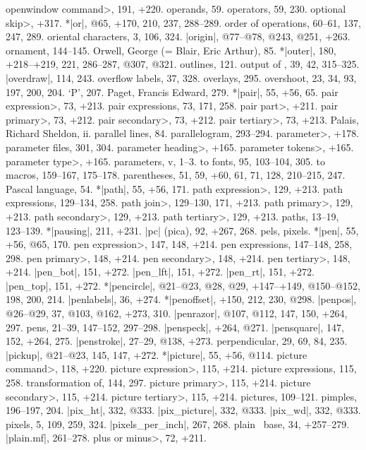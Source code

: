 \<openwindow command>, 191, +220.
operands, 59.
operators, 59, 230.
\<optional skip>, +317.
*|or|, @65, +170, 210, 237, 288--289.
order of operations, 60--61, 137, 247, 289.
oriental characters, 3, 106, 324.
|origin|, @77--@78, @243, @251, +263.
ornament, 144--145.
Orwell, George (= Blair, Eric Arthur), 85.
*|outer|, 180, +218--+219, 221, 286--287, @307, @321.
outlines, 121.
output of \MF, 39, 42, 315--325.
|overdraw|, 114, 243.
overflow labels, 37, 328.
overlays, 295.
overshoot, 23, 34, 93, 197, 200, 204.
\newletter
`P', 207.
Paget, Francis Edward, 279.
*|pair|, 55, +56, 65.
\<pair expression>, 73, +213.
pair expressions, 73, 171, 258.
\<pair part>, +211.
\<pair primary>, 73, +212.
\<pair secondary>, 73, +212.
\<pair tertiary>, 73, +213.
Palais, Richard Sheldon, ii.
parallel lines, 84.
parallelogram, 293--294.
\<parameter>, +178.
parameter files, 301, 304.
\<parameter heading>, +165.
\<parameter tokens>, +165.
\<parameter type>, +165.
parameters, v, 1--3.
\sub to fonts, 95, 103--104, 305.
\sub to macros, 159--167, 175--178.
parentheses, 51, 59, +60, 61, 71, 128, 210--215, 247.
Pascal language, 54.
*|path|, 55, +56, 171.
\<path expression>, 129, +213.
path expressions, 129--134, 258.
\<path join>, 129--130, 171, +213.
\<path primary>, 129, +213.
\<path secondary>, 129, +213.
\<path tertiary>, 129, +213.
paths, 13--19, 123--139.
*|pausing|, 211, +231.
|pc| (pica), 92, +267, 268.
pels, \see pixels.
*|pen|, 55, +56, @65, 170.
\<pen expression>, 147, 148, +214.
pen expressions, 147--148, 258, 298.
\<pen primary>, 148, +214.
\<pen secondary>, 148, +214.
\<pen tertiary>, 148, +214.
|pen_bot|, 151, +272.
|pen_lft|, 151, +272.
|pen_rt|, 151, +272.
|pen_top|, 151, +272.
*|pencircle|, @21--@23, @28, @29, +147--+149, @150--@152, 198, 200, 214.
|penlabels|, 36, +274.
*|penoffset|, +150, 212, 230, @298.
|penpos|, @26--@29, 37, @103, @162, +273, 310.
|penrazor|, @107, @112, 147, 150, +264, 297.
pens, 21--39, 147--152, 297--298.
|penspeck|, +264, @271.
|pensquare|, 147, 152, +264, 275.
|penstroke|, 27--29, @138, +273.
perpendicular, 29, 69, 84, 235.
|pickup|, @21--@23, 145, 147, +272.
*|picture|, 55, +56, @114.
\<picture command>, 118, +220.
\<picture expression>, 115, +214.
picture expressions, 115, 258.
\sub transformation of, 144, 297.
\<picture primary>, 115, +214.
\<picture secondary>, 115, +214.
\<picture tertiary>, 115, +214.
pictures, 109--121.
pimples, 196--197, 204.
|pix_ht|, 332, @333.
|pix_picture|, 332, @333.
|pix_wd|, 332, @333.
pixels, 5, 109, 259, 324.
|pixels_per_inch|, 267, 268.
plain \MF\ base, 34, +257--279.
|plain.mf|, 261--278.
\<plus or minus>, 72, +211.
